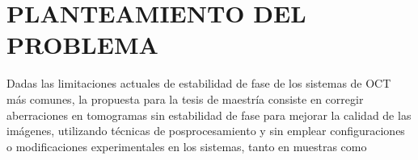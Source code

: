 \newpage
{}
\section{PLANTEAMIENTO DEL PROBLEMA}

Dadas las limitaciones actuales de estabilidad de fase de los sistemas de OCT más comunes, la propuesta para la tesis de maestría consiste en corregir aberraciones en tomogramas sin estabilidad de fase para mejorar la calidad de las imágenes, utilizando técnicas de posprocesamiento y sin emplear configuraciones o modificaciones experimentales en los sistemas, tanto en muestras como